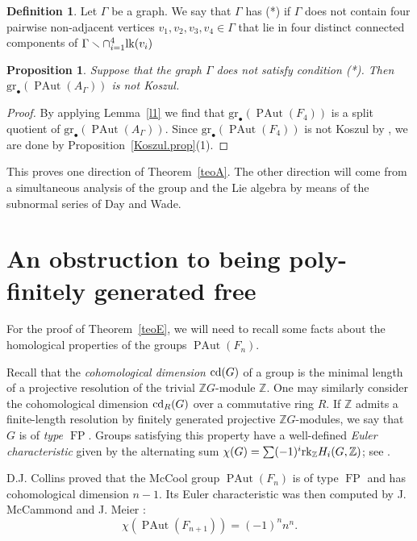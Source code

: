 \documentclass[10pt]{amsart}
\newtheorem{prop}[theorem]{Proposition}
\theoremstyle{definition}
\newtheorem{definition}[theorem]{Definition}
\newcommand{\cd}{{\rm cd}}
\newcommand{\rk}{{\rm rk}}
\newcommand{\lk}{{\rm lk}}
\newcommand{\Z}{\mathbb Z}
\newcommand{\FP}{\operatorname{FP}}
\newcommand{\PAut}{\operatorname{PAut}}
\newcommand{\gr}{\mathrm{gr}_\bullet}
\theoremstyle{definition}
\numberwithin{equation}{section}
\begin{document}
\begin{definition}
 Let $\Gamma$ be a graph. We say that $\Gamma$ has (*) if $\Gamma$ does not contain four   pairwise non-adjacent vertices $v_1, v_2, v_3, v_4 \in \Gamma$ that lie in four distinct connected components of $\Gamma \smallsetminus \cap_{i=1}^4\lk(v_i)$
\end{definition}


\begin{prop}  \label{obstruction}
Suppose that the graph $\Gamma$ does not satisfy condition (*). Then
$\gr(\PAut(A_{\Gamma}))$ is not Koszul.
\end{prop}

\begin{proof}
 By applying Lemma~\ref{l1} we find that $\gr(\PAut(F_4))$ is a split quotient of $\gr(\PAut(A_{\Gamma}))$. Since  $\gr(\PAut(F_4))$ is not Koszul by \cite[Theorem~3.6]{ConnerGoetz}, we are done by Proposition~\ref{Koszul.prop}(1).
 \end{proof}

 This proves one direction of Theorem~\ref{teoA}. The other direction will come from a simultaneous analysis of the group and the Lie algebra by means of the subnormal series of Day and Wade.

\section{An obstruction to being poly-finitely generated free}
For the proof of Theorem~\ref{teoE}, we will need to recall some facts about the homological properties of the groups $\PAut(F_n)$.

Recall that the \emph{cohomological dimension} $\cd(G)$ of a group is the minimal length of a projective resolution of the trivial $\Z G$-module $\Z$. One may similarly consider the cohomological dimension $\cd_R(G)$ over a commutative ring $R$. If $\Z$ admits a finite-length resolution by finitely generated projective $\Z G$-modules, we say that $G$ is of \emph{type $\FP$}. Groups satisfying this property have a well-defined \emph{Euler characteristic } given by the alternating sum $\chi(G) = \sum (-1)^i \rk_\Z H_i(G,\Z)$; see \cite{BrownBook}.

 D.J. Collins \cite{Collins} proved that the McCool group $\PAut(F_n)$ is of type $\FP$ and has cohomological dimension $n-1$. Its Euler characteristic was then computed by J. McCammond and J. Meier \cite[Thm.~1.2]{McCammondMeier}:
\begin{equation} \label{euler}
\chi(\PAut(F_{n+1})) = (-1)^n n^n.
\end{equation}
\end{document}
